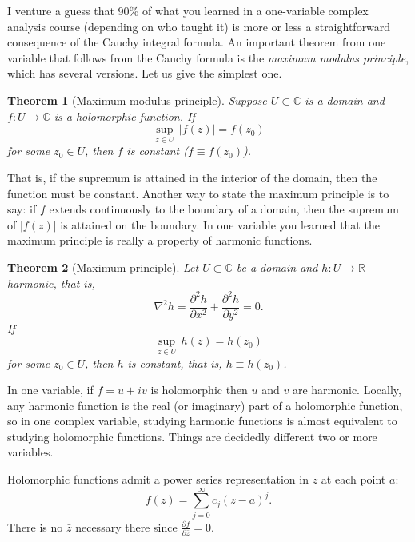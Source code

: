 \documentclass[12pt,openany]{book}
\newcommand{\sabs}[1]{\lvert {#1} \rvert}
\newcommand{\C}{{\mathbb{C}}}
\newcommand{\R}{{\mathbb{R}}}
\newcommand{\myindex}[1]{#1\index{#1}}
\theoremstyle{plain}
\newtheorem{thm}{Theorem}[section]
\theoremstyle{remark}
\theoremstyle{definition}
\theoremstyle{exercise}
\theoremstyle{example}
\begin{document}
I venture a guess that 90\% of what you learned in a one-variable complex analysis
course (depending on who taught it)
is more or less a straightforward consequence of the Cauchy
integral formula.
An important theorem from one variable that follows from
the Cauchy formula is the
\emph{\myindex{maximum modulus principle}},
which has several versions.  Let us give the simplest one.

\begin{thm}[Maximum modulus principle]
Suppose $U \subset \C$ is a domain and $f \colon U \to \C$
is a holomorphic function.
If
\begin{equation*}
\sup_{z \in U} \, \sabs{f(z)} = f(z_0)
\end{equation*}
for some $z_0 \in U$, then $f$ is constant ($f \equiv f(z_0)$).
\end{thm}

That is, if the supremum is attained in the interior of the domain,
then the function must be constant.  Another way to state the maximum
principle is to say: if $f$ extends continuously to the boundary of a
domain, then the supremum of $\sabs{f(z)}$ is attained on the boundary.
In
one variable you learned that the maximum principle is really a
property of harmonic functions.

\begin{thm}[Maximum principle]
Let $U \subset \C$ be a domain and $h \colon U \to \R$
harmonic, that is,
\begin{equation*}
\nabla^2 h = \frac{\partial^2 h}{\partial x^2} + \frac{\partial^2 h}{\partial
y^2} = 0 .
\end{equation*}
If
\begin{equation*}
\sup_{z \in U} \, h(z) = h(z_0)
\end{equation*}
for some $z_0 \in U$, then $h$ is constant, that is, $h \equiv h(z_0)$.
\end{thm}

In one variable, if $f = u+iv$ is holomorphic then $u$ and $v$
are harmonic.  Locally, any harmonic function is
the real (or imaginary) part of a holomorphic function, so in
one complex variable, studying 
harmonic functions is almost equivalent to studying holomorphic
functions.  Things are decidedly different
two or more variables.

\medskip

Holomorphic functions admit a power series representation in $z$
at each point $a$:
\begin{equation*}
f(z) = \sum_{j=0}^\infty c_j {(z-a)}^j .
\end{equation*}
There is no $\bar{z}$ necessary there
since $\frac{\partial f}{\partial \bar{z}} = 0$.
\end{document}

